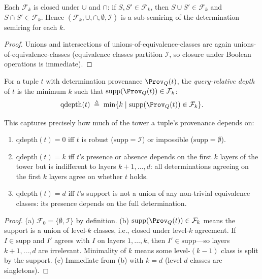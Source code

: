 \begin{proposition}
  \label{prop:filtration-semiring}
  Each $\mathcal{F}_k$ is closed under $\cup$ and $\cap$:
  if $S, S' \in \mathcal{F}_k$, then $S \cup S' \in \mathcal{F}_k$ and
  $S \cap S' \in \mathcal{F}_k$.
  Hence $(\mathcal{F}_k, \cup, \cap, \emptyset, \mathcal{I})$ is a
  sub-semiring of the determination semiring for each $k$.
\end{proposition}
\begin{proof}
  Unions and intersections of unions-of-equivalence-classes are again
  unions-of-equivalence-classes (equivalence classes partition
  $\mathcal{I}$, so closure under Boolean operations is immediate).
\end{proof}

\begin{definition}
  \label{def:query-depth}
  For a tuple $t$ with determination provenance $\Prov_Q(t)$, the
  \emph{query-relative depth} of $t$ is the minimum $k$ such that
  $\mathrm{supp}(\Prov_Q(t)) \in \mathcal{F}_k$:
  \[
    \mathrm{qdepth}(t) \;\triangleq\;
    \min\{k \mid \mathrm{supp}(\Prov_Q(t)) \in \mathcal{F}_k\}.
  \]
\end{definition}

\noindent
This captures precisely how much of the tower a tuple's provenance depends on:

\begin{proposition}
  \label{prop:qdepth-characterization}
  \begin{enumerate}[nosep,label=(\alph*)]
    \item $\mathrm{qdepth}(t) = 0$ iff $t$ is robust
          ($\mathrm{supp} = \mathcal{I}$) or impossible
          ($\mathrm{supp} = \emptyset$).
    \item $\mathrm{qdepth}(t) = k$ iff $t$'s presence or absence depends on
          the first $k$ layers of the tower but is indifferent to layers
          $k+1, \ldots, d$: all determinations agreeing on the first $k$
          layers agree on whether $t$ holds.
    \item $\mathrm{qdepth}(t) = d$ iff $t$'s support is not a union of any
          non-trivial equivalence classes: its presence depends on the full
          determination.
  \end{enumerate}
\end{proposition}
\begin{proof}
  (a) $\mathcal{F}_0 = \{\emptyset, \mathcal{I}\}$ by definition.
  (b) $\mathrm{supp}(\Prov_Q(t)) \in \mathcal{F}_k$ means the support is
  a union of level-$k$ classes, i.e., closed under level-$k$ agreement.
  If $I \in \mathrm{supp}$ and $I'$ agrees with $I$ on layers $1, \ldots, k$,
  then $I' \in \mathrm{supp}$---so layers $k+1, \ldots, d$ are irrelevant.
  Minimality of $k$ means some level-$(k{-}1)$ class is split by the support.
  (c) Immediate from (b) with $k = d$ (level-$d$ classes are singletons).
\end{proof}

